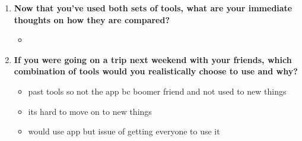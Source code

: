\documentclass[12pt,a4paper]{article}
\begin{document}
\begin{enumerate}
    \item \textbf{Now that you've used both sets of tools, what are your immediate thoughts on how they are compared?}
    
    \begin{itemize}
        \item [N/A]
    \end{itemize}
    
    \item \textbf{If you were going on a trip next weekend with your friends, which combination of tools would you realistically choose to use and why?}
    
    \begin{itemize}
        \item past tools so not the app bc boomer friend and not used to new things
        \item its hard to move on to new things
        \item would use app but issue of getting everyone to use it
    \end{itemize}
\end{enumerate}
\end{document}

